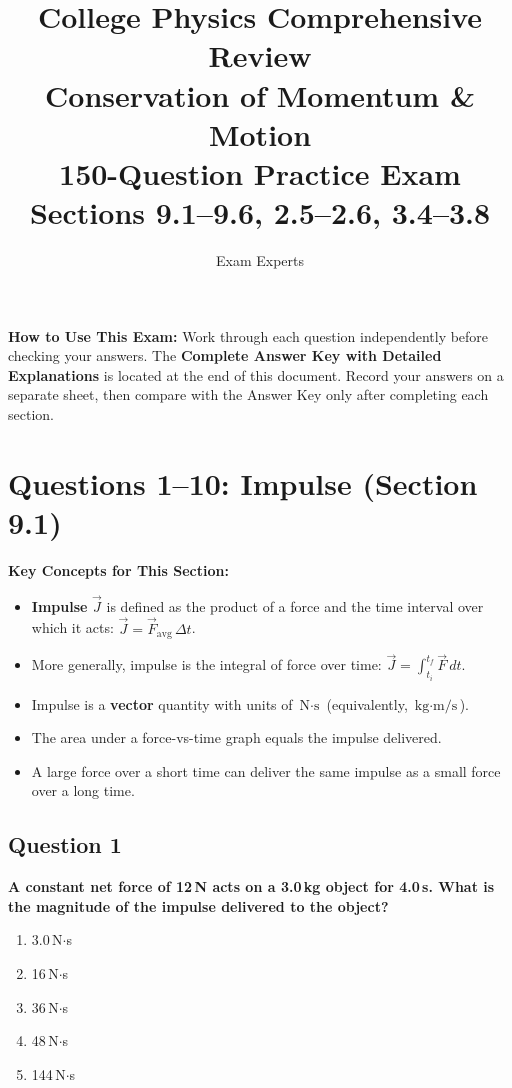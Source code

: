 \documentclass[12pt,letterpaper]{article}
\title{\Huge\textbf{College Physics Comprehensive Review}\\[4pt]
\Large Conservation of Momentum \& Motion\\[4pt]
\Large 150-Question Practice Exam\\[6pt]
\normalsize Sections 9.1--9.6, 2.5--2.6, 3.4--3.8}
\author{Exam Experts}
\date{}
\begin{document}
\maketitle
\tableofcontents
\newpage


\newpage
\begin{importantbox}
\textbf{How to Use This Exam:} Work through each question independently before checking your answers.
The \textbf{Complete Answer Key with Detailed Explanations} is located at the end of this document.
Record your answers on a separate sheet, then compare with the Answer Key only after completing each section.
\end{importantbox}

\section{Questions 1--10: Impulse (Section 9.1)}

\begin{conceptbox}
\textbf{Key Concepts for This Section:}
\begin{itemize}
\item \textbf{Impulse} $\vec{J}$ is defined as the product of a force and the time interval over which it acts: $\vec{J} = \vec{F}_{\text{avg}} \,\Delta t$.
\item More generally, impulse is the integral of force over time: $\vec{J} = \int_{t_i}^{t_f} \vec{F}\,dt$.
\item Impulse is a \textbf{vector} quantity with units of $\text{N}\cdot\text{s}$ (equivalently, $\text{kg}\cdot\text{m/s}$).
\item The area under a force-vs-time graph equals the impulse delivered.
\item A large force over a short time can deliver the same impulse as a small force over a long time.
\end{itemize}
\end{conceptbox}

\subsection{Question 1}

\begin{questionbox}
\textbf{A constant net force of 12\,N acts on a 3.0\,kg object for 4.0\,s. What is the magnitude of the impulse delivered to the object?}

\begin{enumerate}[label=\alph*)]
    \item 3.0\,N$\cdot$s
    \item 16\,N$\cdot$s
    \item 36\,N$\cdot$s
    \item 48\,N$\cdot$s
    \item 144\,N$\cdot$s
\end{enumerate}
\end{questionbox}
\end{document}
